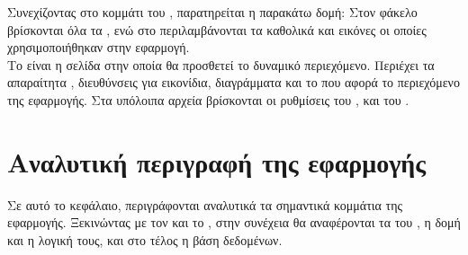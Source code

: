 \pSpace Συνεχίζοντας στο κομμάτι του , παρατηρείται η παρακάτω δομή:
\pSpace Στον φάκελο  βρίσκονται όλα τα , ενώ στο  περιλαμβάνονται τα καθολικά  και εικόνες οι οποίες χρησιμοποιήθηκαν στην εφαρμογή.\\
\pSpace Το  είναι η σελίδα στην οποία θα προσθετεί το δυναμικό περιεχόμενο. Περιέχει τα απαραίτητα , διευθύνσεις για εικονίδια, διαγράμματα και το  που αφορά το περιεχόμενο της εφαρμογής. Στα υπόλοιπα αρχεία βρίσκονται οι ρυθμίσεις του ,  και του .
\section{Αναλυτική περιγραφή της εφαρμογής}
\pSpace Σε αυτό το κεφάλαιο, περιγράφονται αναλυτικά τα σημαντικά κομμάτια της εφαρμογής. Ξεκινώντας με τον  και το , στην συνέχεια θα αναφέρονται τα  του , η δομή και η λογική τους, και στο τέλος η βάση δεδομένων.

